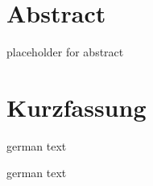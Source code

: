 
\chapter*{Abstract}
\label{chap:abstract}
placeholder for abstract
\chapter*{Kurzfassung}
\label{chap:kurzfassung}
\foreignlanguage{german}{
german text
}

\foreignlanguage{german}{
german text
}


